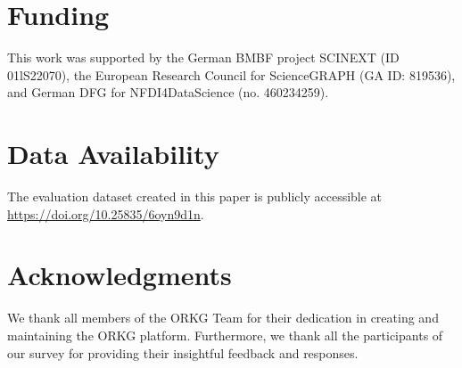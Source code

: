\section*{Funding}

This work was supported by the German BMBF project SCINEXT (ID 01lS22070), the European Research Council for ScienceGRAPH (GA ID: 819536), and German DFG for NFDI4DataScience (no. 460234259).


\section*{Data Availability}

The evaluation dataset created in this paper is publicly accessible at \url{ https://doi.org/10.25835/6oyn9d1n}.


\section*{Acknowledgments}

We thank all members of the ORKG Team for their dedication in creating and maintaining the ORKG platform. Furthermore, we thank all the participants of our survey for providing their insightful feedback and responses.





